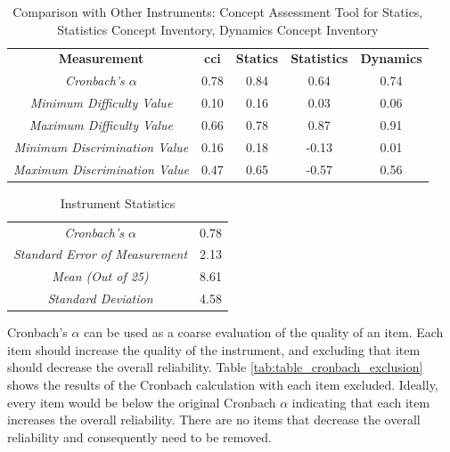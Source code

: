 \FloatBarrier

\begin{table}[!htbp]   
\caption{Comparison with Other Instruments: Concept Assessment Tool for Statics, Statistics Concept Inventory, Dynamics Concept Inventory \cite{jorian}}   
\centering   
\begin{tabular}[width=\textwidth]{ccccc}   
    \toprule
    \textbf{Measurement} & \textbf{\gls{cci}} & \textbf{Statics} & \textbf{Statistics} & \textbf{Dynamics} \\
    \textit{Cronbach's $\alpha$} & 0.78 & 0.84 & 0.64 & 0.74\\   
    \textit{Minimum Difficulty Value} & 0.10 & 0.16 & 0.03 & 0.06 \\   
    \textit{Maximum Difficulty Value} & 0.66 & 0.78 & 0.87 & 0.91 \\   
    \textit{Minimum Discrimination Value} & 0.16 & 0.18 & -0.13 & 0.01\\
    \textit{Maximum Discrimination Value} & 0.47 & 0.65 & -0.57 & 0.56\\   
    \bottomrule   
\end{tabular}   
\label{tab:compare}   
\end{table}  

\begin{table}[!htbp]
\caption{Instrument Statistics}
\centering
\begin{tabular}{cc}
    \toprule
    \textit{Cronbach's $\alpha$} & 0.78 \\
    \textit{Standard Error of Measurement} & 2.13 \\
    \textit{Mean (Out of 25)} & 8.61\\
    \textit{Standard Deviation} & 4.58\\
    \bottomrule
\end{tabular}
\label{tab:overall}
\end{table}


Cronbach's $\alpha$ can be used as a coarse evaluation of the quality of an item. Each item should increase the quality of the instrument, and excluding that item should decrease the overall reliability. Table \ref{tab:table_cronbach_exclusion} shows the results of the Cronbach calculation with each item excluded. Ideally, every item would be below the original Cronbach $\alpha$ indicating that each item increases the overall reliability. There are no items that decrease the overall reliability and consequently need to be removed.

\iffalse
\iflong
\begin{figure}[ht]
    \begin{center}
    \advance\leftskip-.25cm
    \advance\rightskip-.25cm
    \texttt{[image: images/Cronobach's.png]}
    \caption{Cronbach's $\alpha$ with Items Excluded}
    \label{fig:cron}
\end{center}
\end{figure}
\fi
\fi


